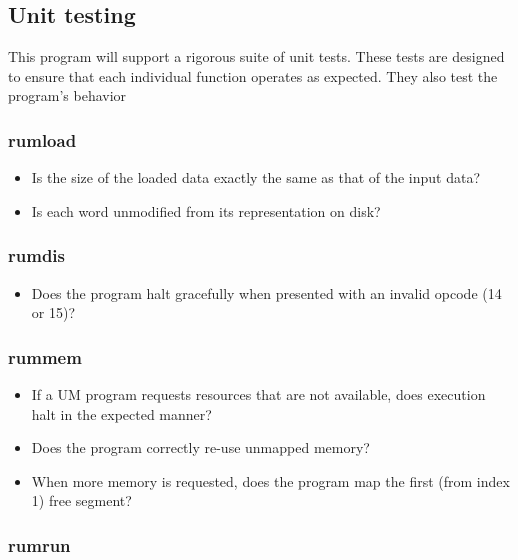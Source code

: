 \documentclass{article}
\begin{document}
\subsection{Unit testing}

This program will support a rigorous suite of unit tests.
These tests are designed to ensure that each individual function operates as expected.
They also test the program's behavior

\subsubsection{rumload}

\begin{itemize}
    \item Is the size of the loaded data exactly the same as that of the input data?
    \item Is each word unmodified from its representation on disk?
\end{itemize}

\subsubsection{rumdis}

\begin{itemize}
    \item Does the program halt gracefully when presented with an invalid opcode (14 or 15)?
\end{itemize}

\subsubsection{rummem}

\begin{itemize}
    \item If a UM program requests resources that are not available, does execution halt in the expected manner?
    \item Does the program correctly re-use unmapped memory?
    \item When more memory is requested, does the program map the first (from index 1) free segment?
\end{itemize}

\subsubsection{rumrun}
\end{document}
